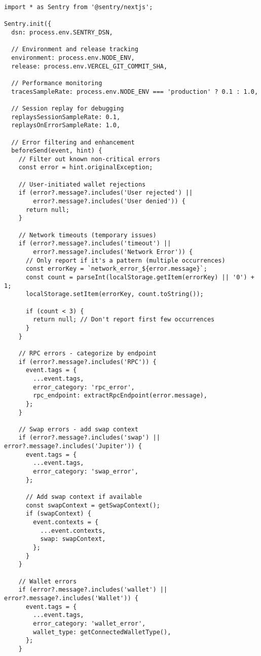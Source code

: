 \documentclass[11pt,a4paper]{article}
\begin{document}
\begin{lstlisting}[style=javascript, caption=Sentry Configuration (sentry.client.config.ts)]
import * as Sentry from '@sentry/nextjs';

Sentry.init({
  dsn: process.env.SENTRY_DSN,
  
  // Environment and release tracking
  environment: process.env.NODE_ENV,
  release: process.env.VERCEL_GIT_COMMIT_SHA,
  
  // Performance monitoring
  tracesSampleRate: process.env.NODE_ENV === 'production' ? 0.1 : 1.0,
  
  // Session replay for debugging
  replaysSessionSampleRate: 0.1,
  replaysOnErrorSampleRate: 1.0,
  
  // Error filtering and enhancement
  beforeSend(event, hint) {
    // Filter out known non-critical errors
    const error = hint.originalException;
    
    // User-initiated wallet rejections
    if (error?.message?.includes('User rejected') || 
        error?.message?.includes('User denied')) {
      return null;
    }
    
    // Network timeouts (temporary issues)
    if (error?.message?.includes('timeout') || 
        error?.message?.includes('Network Error')) {
      // Only report if it's a pattern (multiple occurrences)
      const errorKey = `network_error_${error.message}`;
      const count = parseInt(localStorage.getItem(errorKey) || '0') + 1;
      localStorage.setItem(errorKey, count.toString());
      
      if (count < 3) {
        return null; // Don't report first few occurrences
      }
    }
    
    // RPC errors - categorize by endpoint
    if (error?.message?.includes('RPC')) {
      event.tags = {
        ...event.tags,
        error_category: 'rpc_error',
        rpc_endpoint: extractRpcEndpoint(error.message),
      };
    }
    
    // Swap errors - add swap context
    if (error?.message?.includes('swap') || error?.message?.includes('Jupiter')) {
      event.tags = {
        ...event.tags,
        error_category: 'swap_error',
      };
      
      // Add swap context if available
      const swapContext = getSwapContext();
      if (swapContext) {
        event.contexts = {
          ...event.contexts,
          swap: swapContext,
        };
      }
    }
    
    // Wallet errors
    if (error?.message?.includes('wallet') || error?.message?.includes('Wallet')) {
      event.tags = {
        ...event.tags,
        error_category: 'wallet_error',
        wallet_type: getConnectedWalletType(),
      };
    }
    

\end{lstlisting}
\end{document}
